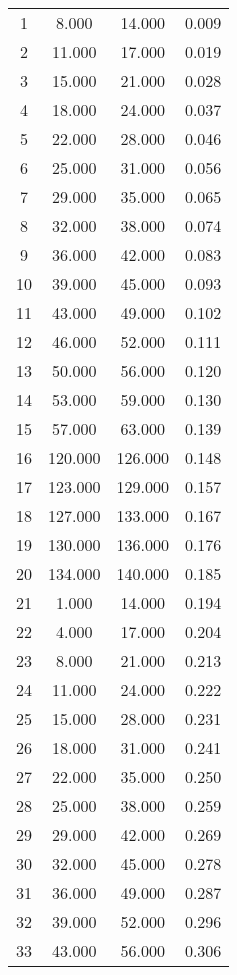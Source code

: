 % 
\begin{tabular}{cccc}
  \hline
  \hline
1 & 8.000 & 14.000 & 0.009 \\ 
  2 & 11.000 & 17.000 & 0.019 \\ 
  3 & 15.000 & 21.000 & 0.028 \\ 
  4 & 18.000 & 24.000 & 0.037 \\ 
  5 & 22.000 & 28.000 & 0.046 \\ 
  6 & 25.000 & 31.000 & 0.056 \\ 
  7 & 29.000 & 35.000 & 0.065 \\ 
  8 & 32.000 & 38.000 & 0.074 \\ 
  9 & 36.000 & 42.000 & 0.083 \\ 
  10 & 39.000 & 45.000 & 0.093 \\ 
  11 & 43.000 & 49.000 & 0.102 \\ 
  12 & 46.000 & 52.000 & 0.111 \\ 
  13 & 50.000 & 56.000 & 0.120 \\ 
  14 & 53.000 & 59.000 & 0.130 \\ 
  15 & 57.000 & 63.000 & 0.139 \\ 
  16 & 120.000 & 126.000 & 0.148 \\ 
  17 & 123.000 & 129.000 & 0.157 \\ 
  18 & 127.000 & 133.000 & 0.167 \\ 
  19 & 130.000 & 136.000 & 0.176 \\ 
  20 & 134.000 & 140.000 & 0.185 \\ 
  21 & 1.000 & 14.000 & 0.194 \\ 
  22 & 4.000 & 17.000 & 0.204 \\ 
  23 & 8.000 & 21.000 & 0.213 \\ 
  24 & 11.000 & 24.000 & 0.222 \\ 
  25 & 15.000 & 28.000 & 0.231 \\ 
  26 & 18.000 & 31.000 & 0.241 \\ 
  27 & 22.000 & 35.000 & 0.250 \\ 
  28 & 25.000 & 38.000 & 0.259 \\ 
  29 & 29.000 & 42.000 & 0.269 \\ 
  30 & 32.000 & 45.000 & 0.278 \\ 
  31 & 36.000 & 49.000 & 0.287 \\ 
  32 & 39.000 & 52.000 & 0.296 \\ 
  33 & 43.000 & 56.000 & 0.306 \\ 

\end{tabular}
